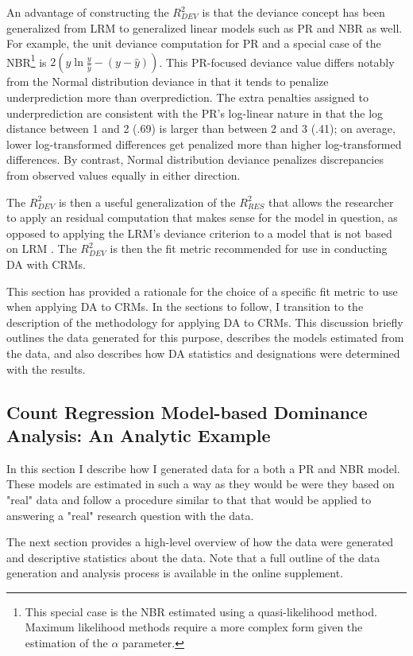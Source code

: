 \documentclass[ShortAfour,times,sageapa]{sagej}
\begin{document}
	An advantage of constructing the $R^{2}_{DEV}$ is that the deviance concept has been generalized from LRM to generalized linear models such as PR and NBR as well.
	For example, the unit deviance computation for PR and a special case of the NBR\footnote{This special case is the NBR estimated using a quasi-likelihood method. Maximum likelihood methods require a more complex form given the estimation of the $\alpha$ parameter.} is $2(y\ln \frac{y}{\hat{y}} - (y - \hat{y}))$. 
	This PR-focused deviance value differs notably from the Normal distribution deviance in that it tends to penalize underprediction more than overprediction.
	The extra penalties assigned to underprediction are consistent with the PR's log-linear nature in that the log distance between 1 and 2 (.69) is larger than between 2 and 3 (.41); on average, lower log-transformed differences get penalized more than higher log-transformed differences.
	By contrast, Normal distribution deviance penalizes discrepancies from observed values equally in either direction.
	
	The $R^{2}_{DEV}$ is then a useful generalization of the $R^{2}_{RES}$ that allows the researcher to apply an residual computation that makes sense for the model in question, as opposed to applying the LRM's deviance criterion to a model that is not based on LRM \cite[.e.g.,]{cameron1996r}.
	The $R^{2}_{DEV}$ is then the fit metric recommended for use in conducting DA with CRMs.
	
	This section has provided a rationale for the choice of a specific fit metric to use when applying DA to CRMs.
	In the sections to follow, I transition to the description of the methodology for applying DA to CRMs.
	This discussion briefly outlines the data generated for this purpose, describes the models estimated from the data, and also describes how DA statistics and designations were determined with the results.
	
	\subsection{Count Regression Model-based Dominance Analysis: An Analytic Example}
	
	In this section I describe how I generated data for a both a PR and NBR model.
	These models are estimated in such a way as they would be were they based on "real" data and follow a procedure similar to that that would be applied to answering a "real" research question with the data.
	
	The next section provides a high-level overview of how the data were generated and descriptive statistics about the data.
	Note that a full outline of the data generation and analysis process is available in the online supplement.
	
\end{document}
